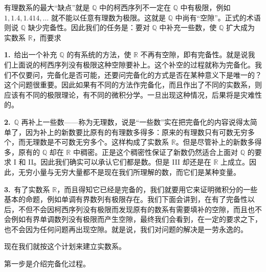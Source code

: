 有理数系的最大“缺点”就是 $\mathbb Q$ 中的柯西序列不一定在 $\mathbb Q$ 中有极限，例如 $1,1.4,1.414,\ldots$ 就不能以任意有理数为极限。这就是 $\mathbb Q$ 中尚有“空隙”。正式的术语则说 $\mathbb Q$ 缺少完备性。因此我们的任务是：要对 $\mathbb Q$ 中补充一些数，使 $\mathbb Q$ 扩大成为实数系 $\mathbb R$，而要求

\noindent\textbf{1.}\ 给出一个补充 $\mathbb Q$ 的有系统的方法，使 $\mathbb R$ 不再有空隙，即有完备性。就是说我们上面说的柯西序列没有极限这种空隙要补上。这个补空的过程就称为完备化。我们不仅要问，完备化是否可能，还要问完备化的方式是否在某种意义下是唯一的？这个问题很重要。因此如果有不同的方法作完备化，而且作出了不同的实数系，则应该有不同的极限理论，有不同的微积分学。一旦出现这种情况，后果将是灾难性的。

\noindent\textbf{2.}\ $\mathbb Q$ 再补上一些数——称为无理数，说是“一些数”实在把完备化的内容说得太简单了，因为补上的新数要比原有的有理数多得多：原来的有理数只有可数无穷多个，而无理数是不可数无穷多个。这样构成了实数系 $\mathbb R$。但是尽管补上的新数多得多，原有的 $\mathbb Q$ 却在 $\mathbb R$ 中稠密。正是这个稠密性保证了新数仍然适合上面对 $\mathbb Q$ 的要求 I 和 II。因此我们确实可以承认它们都是数。但是 III 却还是在 $\mathbb R$ 上成立。因此，无穷小量与无穷大量都不是现在我们所理解的数，而它们是某种变量。

\noindent\textbf{3.}\ 有了实数系 $\mathbb R$，而且得知它已经是完备的，我们就要用它来证明微积分的一些基本的命题，例如单调有界数列有极限存在。我们下面会讲到，在有了完备性以后，不但不会因柯西序列没有极限而发现原有的数系有需要填补的空隙，而且也不会例如有界单调数列没有极限而产生空隙，最终我们会看到，在一定的要求之下，也不会因为任何问题再出现空隙。就是说，我们对问题的解决是一劳永逸的。

现在我们就按这个计划来建立实数系。

第一步是介绍完备化过程。

